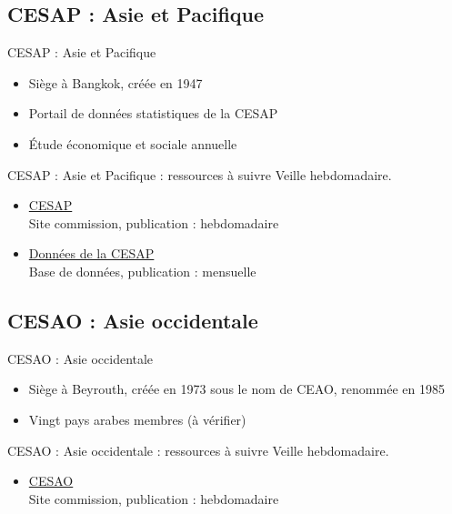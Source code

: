 \documentclass[aspectratio=169,11pt]{beamer}
\begin{document}
\subsection{CESAP : Asie et Pacifique}
\begin{frame}{CESAP : Asie et Pacifique}
\begin{itemize}
\item Siège à Bangkok, créée en 1947
\item Portail de données statistiques de la CESAP
\item Étude économique et sociale annuelle
\end{itemize}
\end{frame}

\begin{frame}{CESAP : Asie et Pacifique : ressources à suivre}
\small
Veille hebdomadaire.
\begin{itemize}
\item \href{https://www.unescap.org}{CESAP}\\{\footnotesize Site commission, publication : hebdomadaire}
\item \href{https://data.unescap.org}{Données de la CESAP}\\{\footnotesize Base de données, publication : mensuelle}
\end{itemize}
\end{frame}

\subsection{CESAO : Asie occidentale}
\begin{frame}{CESAO : Asie occidentale}
\begin{itemize}
\item Siège à Beyrouth, créée en 1973 sous le nom de CEAO, renommée en 1985
\item Vingt pays arabes membres (à vérifier)
\end{itemize}
\end{frame}

\begin{frame}{CESAO : Asie occidentale : ressources à suivre}
\small
Veille hebdomadaire.
\begin{itemize}
\item \href{https://www.unescwa.org}{CESAO}\\{\footnotesize Site commission, publication : hebdomadaire}
\end{itemize}
\end{frame}
\end{document}
